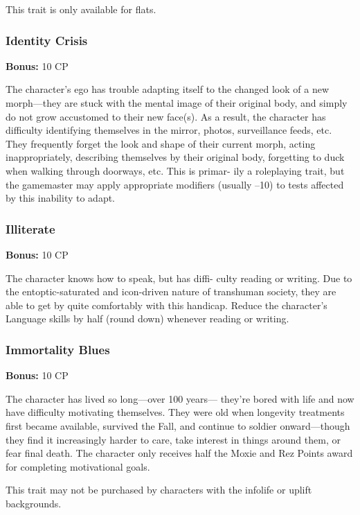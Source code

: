This trait is only available for flats.

\subsubsection{Identity Crisis}

\textbf{Bonus:} 10 CP

The character's ego has trouble adapting itself to 
the changed look of a new morph—they are stuck 
with the mental image of their original body, and 
simply do not grow accustomed to their new face(s). 
As a result, the character has difficulty  identifying 
themselves in the mirror, photos, surveillance feeds, 
etc. They frequently forget the look and shape of their 
current morph, acting inappropriately, describing 
themselves by their original body, forgetting to duck 
when walking through doorways, etc. This is primar-
ily a roleplaying trait, but the gamemaster may apply 
appropriate modifiers (usually –10) to tests affected 
by this inability to adapt.

\subsubsection{Illiterate}

\textbf{Bonus:} 10 CP

The character knows how to speak, but has diffi-
culty reading or writing. Due to the entoptic-saturated 
and icon-driven nature of transhuman society, they are 
able to get by quite comfortably with this handicap. 
Reduce the character's Language skills by half (round 
down) whenever reading or writing.

\subsubsection{Immortality Blues}

\textbf{Bonus:} 10 CP

The character has lived so long—over 100 years—
they're bored with life and now have difficulty 
motivating themselves. They were old when longevity 
treatments first became available, survived the Fall, 
and continue to soldier onward—though they find 
it increasingly harder to care, take interest in things 
around them, or fear final death. The character only 
receives half the Moxie and Rez Points award for 
completing motivational goals.

This trait may not be purchased by characters with 
the infolife or uplift backgrounds.

